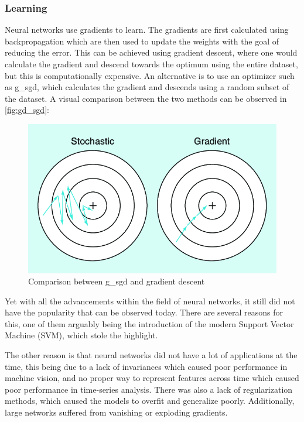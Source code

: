 \subsubsection{Learning}
Neural networks use gradients to learn. The gradients are first calculated using backpropagation which are then used to update the weights with the goal of reducing the error. This can be achieved using gradient descent, where one would calculate the gradient and descend towards the optimum using the entire dataset, but this is computationally expensive. An alternative is to use an optimizer such as \gls*{g_sgd}\cite{sgd}, which calculates the gradient and descends using a random subset of the dataset. A visual comparison between the two methods can be observed in \autoref{fig:gd_sgd}:
\begin{figure}[H]
    \centering
    \includegraphics[width=0.8\linewidth]{resources/related_works/gradient_descent}
    \caption{Comparison between \gls*{g_sgd} and gradient descent}
    \label{fig:gd_sgd}
\end{figure}
\par
Yet with all the advancements within the field of neural networks, it still did not have the popularity that can be observed today. There are several reasons for this, one of them arguably being the introduction of the modern Support Vector Machine (SVM)\cite{svm}, which stole the highlight.
\par
The other reason is that neural networks did not have a lot of applications at the time, this being due to a lack of invariances which caused poor performance in machine vision, and no proper way to represent features across time which caused poor performance in time-series analysis. There was also a lack of regularization methods, which caused the models to overfit and generalize poorly. Additionally, large networks suffered from vanishing or exploding gradients.
\par
